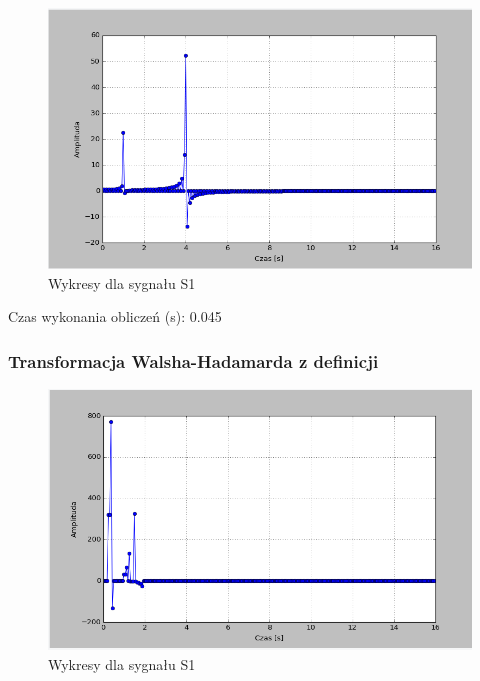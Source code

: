 \documentclass{article}
\begin{document}
{            
                \begin{figure}[h!]
                    \centering
                    \includegraphics[width=1\textwidth]{img/dcts1.png}
                    \caption{Wykresy dla sygnału S1}
                \end{figure}
                \FloatBarrier

                Czas wykonania obliczeń (s): 0.045
            
            \subsubsection{Transformacja Walsha-Hadamarda z definicji}

            
                \begin{figure}[h!]
                    \centering
                    \includegraphics[width=1\textwidth]{img/walshs1.png}
                    \caption{Wykresy dla sygnału S1}
                \end{figure}
                \FloatBarrier

}
\end{document}
